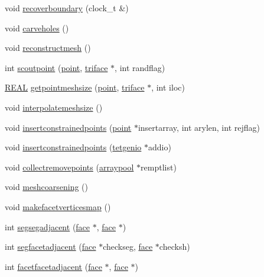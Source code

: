 \begin{DoxyCompactItemize}
\item 
void \hyperlink{classtetgenmesh_a1be7dce56688fbe7a97fc31f98b61c19}{recoverboundary} (clock\+\_\+t \&)
\item 
void \hyperlink{classtetgenmesh_ad71017c71bd2cac0232c410a651ed085}{carveholes} ()
\item 
void \hyperlink{classtetgenmesh_ad44b2ea3720da385a0cbcf306884e126}{reconstructmesh} ()
\item 
int \hyperlink{classtetgenmesh_a230d03da7e72e7092f5f51886806dd9b}{scoutpoint} (\hyperlink{classtetgenmesh_ace3fb4f80389185b7c9b18ab69a3dea2}{point}, \hyperlink{classtetgenmesh_1_1triface}{triface} $\ast$, int randflag)
\item 
\hyperlink{tetgen_8h_a4b654506f18b8bfd61ad2a29a7e38c25}{R\+E\+AL} \hyperlink{classtetgenmesh_a88f9f3b6bb6fb16418d028dd7d920ad0}{getpointmeshsize} (\hyperlink{classtetgenmesh_ace3fb4f80389185b7c9b18ab69a3dea2}{point}, \hyperlink{classtetgenmesh_1_1triface}{triface} $\ast$, int iloc)
\item 
void \hyperlink{classtetgenmesh_a78dbc1dcd69c15ee0f7f226be1078008}{interpolatemeshsize} ()
\item 
void \hyperlink{classtetgenmesh_ac8205cae8e16f490b80d74975934ff74}{insertconstrainedpoints} (\hyperlink{classtetgenmesh_ace3fb4f80389185b7c9b18ab69a3dea2}{point} $\ast$insertarray, int arylen, int rejflag)
\item 
void \hyperlink{classtetgenmesh_ab859365ca3dd3eafb77fac56d0ae3a03}{insertconstrainedpoints} (\hyperlink{classtetgenio}{tetgenio} $\ast$addio)
\item 
void \hyperlink{classtetgenmesh_add13a24cf325595ef693dca96f81470c}{collectremovepoints} (\hyperlink{classtetgenmesh_1_1arraypool}{arraypool} $\ast$remptlist)
\item 
void \hyperlink{classtetgenmesh_a85e17b620820cbcb6cb47b565f822062}{meshcoarsening} ()
\item 
void \hyperlink{classtetgenmesh_afa650c7021f3c73cf786d3f7fa687ed7}{makefacetverticesmap} ()
\item 
int \hyperlink{classtetgenmesh_a15f22ccbe981fc0d0eb4342a3c75d515}{segsegadjacent} (\hyperlink{classtetgenmesh_1_1face}{face} $\ast$, \hyperlink{classtetgenmesh_1_1face}{face} $\ast$)
\item 
int \hyperlink{classtetgenmesh_adf193bbe36f5075b209f0d71fc74a18b}{segfacetadjacent} (\hyperlink{classtetgenmesh_1_1face}{face} $\ast$checkseg, \hyperlink{classtetgenmesh_1_1face}{face} $\ast$checksh)
\item 
int \hyperlink{classtetgenmesh_a60303418c35324c87dfa1fcb3b160708}{facetfacetadjacent} (\hyperlink{classtetgenmesh_1_1face}{face} $\ast$, \hyperlink{classtetgenmesh_1_1face}{face} $\ast$)

\end{DoxyCompactItemize}
